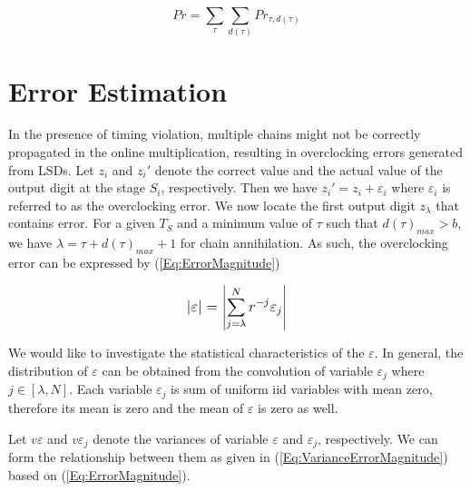 \documentclass[journal]{IEEEtran}
\begin{document}
\begin{equation}\label{Eq:Prob_timingViol}
Pr= \sum_\tau \sum_{d(\tau)} Pr_{\tau,d(\tau )}
\end{equation}


\section{Error Estimation}

In the presence of timing violation, multiple chains might not be correctly propagated in the online multiplication, resulting in overclocking errors generated from LSDs. Let $z_i$ and ${z_i}'$ denote the correct value and the actual value of the output digit at the stage $S_i$, respectively. Then we have ${z_i}'=z_i+\varepsilon_i$ where $\varepsilon_i$ is referred to as the overclocking error. We now locate the first output digit $z_{\lambda}$ that contains error. For a given $T_S$ and a minimum value of $\tau$ such that $d(\tau)_{max}>b$, we have $\lambda=\tau+d(\tau)_{max}+1$ for chain annihilation.
%
%
As such, the overclocking error can be expressed by (\ref{Eq:ErrorMagnitude})

%
\begin{eqnarray}\label{Eq:ErrorMagnitude}
\scriptsize
 \left| \varepsilon\right|= \left|\sum_{j=\lambda}^{N} r^{-j}\varepsilon_j\right|
\normalsize
\end{eqnarray}

We would like to investigate the statistical characteristics of the $\varepsilon$. In general, the distribution of $\varepsilon$ can be obtained from the convolution of variable $\varepsilon_j$ where $j\in[\lambda,N]$. Each variable $\varepsilon_j$ is sum of uniform iid variables with mean zero, therefore its mean is zero and the mean of $\varepsilon$ is zero as well.

Let $v\varepsilon$ and $v\varepsilon_j$ denote the variances of variable $\varepsilon$ and $\varepsilon_j$, respectively. We can form the relationship between them as given in (\ref{Eq:VarianceErrorMagnitude}) based on (\ref{Eq:ErrorMagnitude}).
\end{document}
